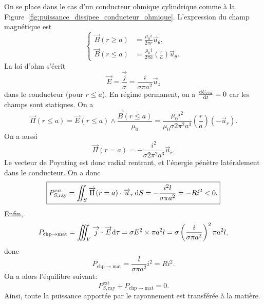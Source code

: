 On se place dans le cas d'un conducteur ohmique cylindrique comme à la Figure~\ref{fig:puissance_dissipee_conducteur_ohmique}. L'expression du champ magnétique est
\begin{equation}
    \left\lbrace
        \begin{aligned}
            \vec{B}(r\geqslant a)&=\frac{\mu_0 i}{2\pi r}\vec{u}_{\theta},\\
            \vec{B}(r\leqslant a)&=\frac{\mu_0 i}{2\pi a}\left(\frac{r}{a}\right)\vec{u}_{\theta}.
        \end{aligned}
    \right.
\end{equation}
La loi d'ohm s'écrit
\begin{equation}
    \vec{E}=\frac{\vec{j}}{\sigma}=\frac{i}{\sigma\pi a^{2}}\vec{u}_z
\end{equation}
dans le conducteur (pour $r\leqslant a$). En régime permanent, on a $\frac{\mathrm{d} U_{\mathrm{em}}}{\mathrm{d} t}=0$ car les champs sont statiques. On a 
\begin{equation}
    \vec{\Pi}(r \leqslant a)=\vec{E}(r\leqslant a)\wedge \frac{\vec{B}(r\leqslant a)}{\mu_0}=\frac{\mu_0 i^{2}}{\mu_0\sigma 2\pi^{2}a^{3}}\left(\frac{r}{a}\right)(-\vec{u}_r).
\end{equation}
On a aussi
\begin{equation}
    \boxed{
        \vec{\Pi}(r=a)=-\frac{i^{2}}{\sigma 2\pi^{2}a^{3}}\vec{u}_r.
    }
\end{equation}
Le vecteur de Poynting est donc radial rentrant, et l'énergie pénètre latéralement dans le conducteur.
On a donc
\begin{equation}
    \boxed{
        P_{S,\mathrm{ray}}^{\mathrm{ext}}=\iint_{S}\protect\overrightarrow{{\Pi}}(r=a)\cdot\protect\overrightarrow{{u}}_r\,\mathrm{d} S=-\frac{i^{2}l}{\sigma\pi a^{2}}=-R i^{2}<0.
    }
\end{equation}
Enfin,
\begin{equation}
    P_{\mathrm{chp}\to\mathrm{mat}}=\iiint_{V}\protect\overrightarrow{{j}}\cdot\protect\overrightarrow{{E}}\mathrm{d}\tau=\sigma E^{2}\times\pi a^{2}l=\sigma\left(\frac{i}{\sigma\pi a^{2}}\right)^{2}\pi a^{2}l,
\end{equation}
donc
\begin{equation}
    \boxed{
        P_{\mathrm{chp}\to\mathrm{mat}}=\frac{l}{\sigma\pi a^{2}}i^{2}=Ri^{2}.
    }
\end{equation}
On a alors l'équilibre suivant:
\begin{equation}
    \boxed{
        P_{S,\mathrm{ray}}^{\mathrm{ext}}+P_{\mathrm{chp}\to\mathrm{mat}}=0.
    }
\end{equation}
Ainsi, toute la puissance apportée par le rayonnement est transférée à la matière.